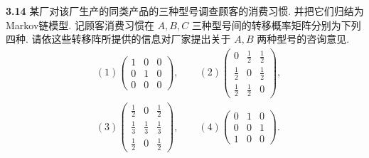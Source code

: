 \documentclass{article}
\newenvironment{problem}[1]{\begin{framed}\par\noindent\textbf{#1} }{\end{framed}\par}
\begin{document}
\begin{problem}{3.14}
	某厂对该厂生产的同类产品的三种型号调查顾客的消费习惯. 并把它们归结为Markov链模型. 记顾客消费习惯在 $A, B, C $ 三种型号间的转移概率矩阵分别为下列四种. 请依这些转移阵所提供的信息对厂家提出关于 $A, B$ 两种型号的咨询意见.
	\[
		\begin{split}
		&(1)\begin{pmatrix}
				1 & 0 & 0\\
				0 & 1 & 0\\
				0 & 0 & 0
			\end{pmatrix},\qquad
		(2)\begin{pmatrix}
				0 & \frac{1}{2} & \frac{1}{2}\\
				\frac{1}{2} & 0 & \frac{1}{2}\\
				\frac{1}{2} & \frac{1}{2} & 0
		\end{pmatrix},\\[0.5cm]
		&(3)\begin{pmatrix}
				\frac{1}{2} & 0 & \frac{1}{2}\\
				\frac{1}{3} & \frac{1}{3} & \frac{1}{3}\\
				\frac{1}{2} & 0 & \frac{1}{2}
			\end{pmatrix},\qquad
		(4)\begin{pmatrix}
				0 & 1 & 0\\
				0 & 0 & 1\\
				1 & 0 & 0
			\end{pmatrix}.
		\end{split}
	\]
\end{problem}
\end{document}
